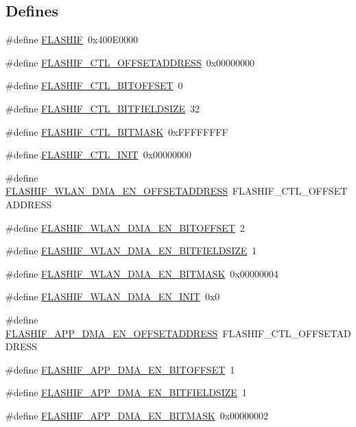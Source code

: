 \subsection*{Defines}
\begin{DoxyCompactItemize}
\item 
\#define \hyperlink{a00552_aad1373abc9f9c93f8762d989ddad64d8}{FLASHIF}~0x400E0000
\item 
\#define \hyperlink{a00552_a5a5da68c0baff91fa5c6221fcc91b088}{FLASHIF\_\-CTL\_\-OFFSETADDRESS}~0x00000000
\item 
\#define \hyperlink{a00552_a973c4942995915c951cc6041b2aa21a6}{FLASHIF\_\-CTL\_\-BITOFFSET}~0
\item 
\#define \hyperlink{a00552_a7dcecf5028f3feda33e00fede650fd0c}{FLASHIF\_\-CTL\_\-BITFIELDSIZE}~32
\item 
\#define \hyperlink{a00552_addc9953e330d3a239c9ddda09b50fc9b}{FLASHIF\_\-CTL\_\-BITMASK}~0xFFFFFFFF
\item 
\#define \hyperlink{a00552_a38eb4b22c1bf88a6023e73474ec97912}{FLASHIF\_\-CTL\_\-INIT}~0x00000000
\item 
\#define \hyperlink{a00552_aea12309b80d15782960d7964ae7843b7}{FLASHIF\_\-WLAN\_\-DMA\_\-EN\_\-OFFSETADDRESS}~FLASHIF\_\-CTL\_\-OFFSETADDRESS
\item 
\#define \hyperlink{a00552_aef5c87536118ad3c06f939b94b8d2e4b}{FLASHIF\_\-WLAN\_\-DMA\_\-EN\_\-BITOFFSET}~2
\item 
\#define \hyperlink{a00552_a69b7dee3681539cc6d39854eec7f47ad}{FLASHIF\_\-WLAN\_\-DMA\_\-EN\_\-BITFIELDSIZE}~1
\item 
\#define \hyperlink{a00552_a202216ab2190f8a25d0af70c19ca4341}{FLASHIF\_\-WLAN\_\-DMA\_\-EN\_\-BITMASK}~0x00000004
\item 
\#define \hyperlink{a00552_ad462edcae87dab04d2b68097724fa7bf}{FLASHIF\_\-WLAN\_\-DMA\_\-EN\_\-INIT}~0x0
\item 
\#define \hyperlink{a00552_a71353c86bdfce1e8a2a6eb91e37918b5}{FLASHIF\_\-APP\_\-DMA\_\-EN\_\-OFFSETADDRESS}~FLASHIF\_\-CTL\_\-OFFSETADDRESS
\item 
\#define \hyperlink{a00552_aaaa697c2b6610a5951d43fad7122aad4}{FLASHIF\_\-APP\_\-DMA\_\-EN\_\-BITOFFSET}~1
\item 
\#define \hyperlink{a00552_a4d0b377a6aa4ff04c83bfba0c3033bf1}{FLASHIF\_\-APP\_\-DMA\_\-EN\_\-BITFIELDSIZE}~1
\item 
\#define \hyperlink{a00552_acfa2f845fc07164b7fd82a0077f65da8}{FLASHIF\_\-APP\_\-DMA\_\-EN\_\-BITMASK}~0x00000002
\item 

\end{DoxyCompactItemize}
